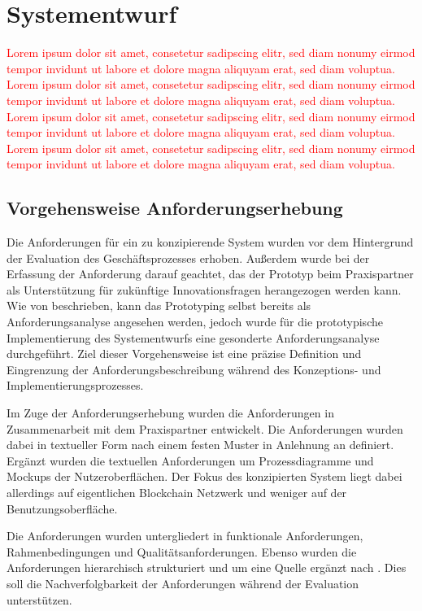 \section{Systementwurf}
\textcolor{red}{Lorem ipsum dolor sit amet, consetetur sadipscing elitr, sed diam nonumy eirmod tempor invidunt ut labore et dolore magna aliquyam erat, sed diam voluptua. Lorem ipsum dolor sit amet, consetetur sadipscing elitr, sed diam nonumy eirmod tempor invidunt ut labore et dolore magna aliquyam erat, sed diam voluptua. Lorem ipsum dolor sit amet, consetetur sadipscing elitr, sed diam nonumy eirmod tempor invidunt ut labore et dolore magna aliquyam erat, sed diam voluptua. Lorem ipsum dolor sit amet, consetetur sadipscing elitr, sed diam nonumy eirmod tempor invidunt ut labore et dolore magna aliquyam erat, sed diam voluptua.}

\subsection{Vorgehensweise Anforderungserhebung}
Die Anforderungen für ein zu konzipierende System wurden vor dem Hintergrund der Evaluation des Geschäftsprozesses erhoben. Außerdem wurde bei der Erfassung der Anforderung darauf geachtet, das der Prototyp beim Praxispartner als Unterstützung für zukünftige Innovationsfragen herangezogen werden kann. Wie von \citet{Dick2017, HullElizabeth2011} beschrieben, kann das Prototyping selbst bereits als Anforderungsanalyse angesehen werden, jedoch wurde für die prototypische Implementierung des Systementwurfs eine gesonderte Anforderungsanalyse durchgeführt. Ziel dieser Vorgehensweise ist eine präzise Definition und Eingrenzung der Anforderungsbeschreibung während des Konzeptions- und Implementierungsprozesses.

Im Zuge der Anforderungserhebung wurden die Anforderungen in Zusammenarbeit mit dem Praxispartner entwickelt. Die Anforderungen wurden dabei in textueller Form nach einem festen Muster in Anlehnung an \citet{PohlKlaus2015} definiert. Ergänzt wurden die textuellen Anforderungen um Prozessdiagramme und Mockups der Nutzeroberflächen. Der Fokus des konzipierten System liegt dabei allerdings auf eigentlichen Blockchain Netzwerk und weniger auf der Benutzungsoberfläche.

Die Anforderungen wurden untergliedert in funktionale Anforderungen, Rahmenbedingungen und Qualitätsanforderungen. Ebenso wurden die Anforderungen hierarchisch strukturiert und um eine Quelle ergänzt nach \citet{Koelsch2016}. Dies soll die Nachverfolgbarkeit der Anforderungen während der Evaluation unterstützen.

